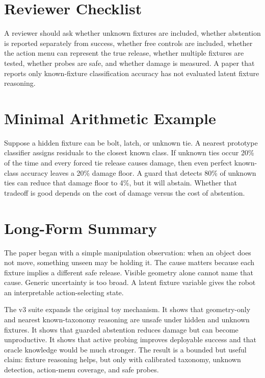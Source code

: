 \documentclass{article}
\begin{document}
\section{Reviewer Checklist}

A reviewer should ask whether unknown fixtures are included, whether
abstention is reported separately from success, whether free controls are
included, whether the action menu can represent the true release, whether
multiple fixtures are tested, whether probes are safe, and whether damage is
measured. A paper that reports only known-fixture classification accuracy has
not evaluated latent fixture reasoning.

\section{Minimal Arithmetic Example}

Suppose a hidden fixture can be bolt, latch, or unknown tie. A nearest
prototype classifier assigns residuals to the closest known class. If unknown
ties occur 20\% of the time and every forced tie release causes damage, then
even perfect known-class accuracy leaves a 20\% damage floor. A guard that
detects 80\% of unknown ties can reduce that damage floor to 4\%, but it will
abstain. Whether that tradeoff is good depends on the cost of damage versus
the cost of abstention.

\section{Long-Form Summary}

The paper began with a simple manipulation observation: when an object does
not move, something unseen may be holding it. The cause matters because each
fixture implies a different safe release. Visible geometry alone cannot name
that cause. Generic uncertainty is too broad. A latent fixture variable gives
the robot an interpretable action-selecting state.

The v3 suite expands the original toy mechanism. It shows that geometry-only
and nearest known-taxonomy reasoning are unsafe under hidden and unknown
fixtures. It shows that guarded abstention reduces damage but can become
unproductive. It shows that active probing improves deployable success and
that oracle knowledge would be much stronger. The result is a bounded but
useful claim: fixture reasoning helps, but only with calibrated taxonomy,
unknown detection, action-menu coverage, and safe probes.
\end{document}
